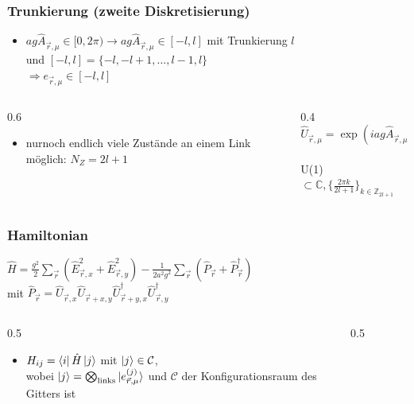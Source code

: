 \documentclass{beamer}
\begin{document}
\begin{frame}
	\frametitle{Trunkierung (zweite Diskretisierung)}
	\begin{itemize}
		\item $ag\hat{A}_{\vec{r}, \mu}\in[0,2\pi)\rightarrow ag\hat{A}_{\vec{r}, \mu}\in[-l,l]$ mit Trunkierung $l$
		      \\
		      und $[-l,l]=\{-l,-l+1,\dots,l-1,l\}$\\
		      $\Rightarrow e_{\vec{r}, \mu} \in [-l,l]$
	\end{itemize}
	\begin{columns}
		\begin{column}{0.6\textwidth}
			\begin{itemize}
				\item nurnoch endlich viele Zustände an einem Link möglich: $N_Z=2l+1$
			\end{itemize}
		\end{column}
		\begin{column}{0.4\textwidth}
			$\hat{U}_{\vec{r}, \mu}=\exp{(iag\hat{A}_{\vec{r}, \mu})}$\\
			\,\\
			U(1) $\subset \mathbb{C}, \{\frac{2\pi k}{2l+1}\}_{k\in\mathbb{Z}_{2l+1}}$\\
			\begin{figure}[h]
				
			\end{figure}
		\end{column}
	\end{columns}
\end{frame}

\begin{frame}
	\frametitle{Hamiltonian}
	$\hat{H}=\frac{g^2}{2}\sum_{\vec{r}}(\hat{E}_{\vec{r}, x}^2+\hat{E}_{\vec{r}, y}^2)-\frac{1}{2a^2g^2}\sum_{\vec{r}}(\hat{P}_{\vec{r}}+\hat{P}_{\vec{r}}^\dag)$\\
	mit $\hat{P}_{\vec{r}}=\hat{U}_{\vec{r}, x}\hat{U}_{\vec{r}+x,y}\hat{U}^{\dag}_{\vec{r}+y,x}\hat{U}^{\dag}_{\vec{r},y}$

	\begin{columns}
		\begin{column}{0.5\textwidth}
			\begin{itemize}
				\item $H_{ij}=\bra{i}\hat{H}\ket{j}$ mit $\ket{j}\in\mathcal{C}$,\\
				      wobei $\ket{j}=\bigotimes_\text{links}\ket{e^{(j)}_{\vec{r}, \mu}}$ und $\mathcal{C}$ der Konfigurationsraum des Gitters ist
			\end{itemize}
		\end{column}
		\begin{column}{0.5\textwidth}
			\begin{figure}
				
			\end{figure}
		\end{column}
	\end{columns}

\end{frame}
\end{document}
